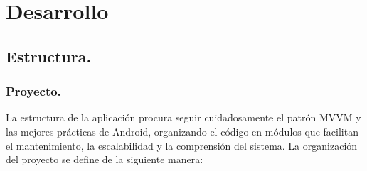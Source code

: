 \section{Desarrollo}
\subsection{Estructura.}

\subsubsection{Proyecto.}

La estructura de la aplicación procura seguir cuidadosamente el patrón MVVM y las mejores prácticas de Android, organizando el código en módulos que facilitan el mantenimiento, la escalabilidad y la comprensión del sistema. La organización del proyecto se define de la siguiente manera:

